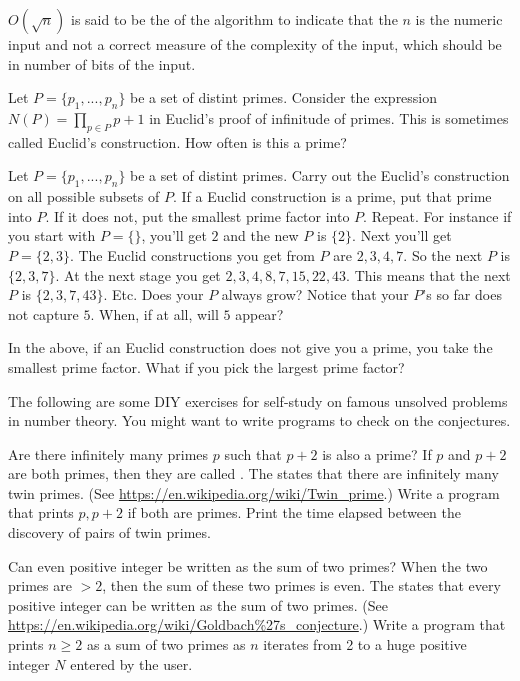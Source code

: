$O(\sqrt{n})$ is said to be the  of the
algorithm
to indicate that the $n$ is the numeric input and not a
correct measure of the complexity of the input,
which should be in number of bits of the input.

\begin{ex}
  Let $P = \{p_1, ..., p_n\}$ be a set of distint primes.
  Consider the expression $N(P) = \prod_{p \in P} p + 1$ in Euclid's proof of infinitude of primes. 
  This is sometimes called Euclid's construction.
  How often is this a prime?
\end{ex}

\begin{ex}
  Let $P = \{p_1, ..., p_n\}$ be a set of distint primes.
  Carry out the Euclid's construction on all possible subsets of $P$.
  If a Euclid construction is a prime, put that prime into $P$.
  If it does not, put the smallest prime factor into $P$.
  Repeat.
  For instance if you start with $P = \{\}$,
  you'll get $2$ and the new $P$ is $\{2\}$.
  Next you'll get $P = \{2, 3\}$.
  The Euclid constructions you get from $P$ are $2, 3, 4, 7$.
  So the next $P$ is $\{2, 3, 7\}$.
  At the next stage you get $2, 3, 4, 8, 7, 15, 22, 43$.
  This means that the next $P$ is $\{2, 3, 7, 43\}$.
  Etc.
  Does your $P$ always grow?
  Notice that your $P$'s so far does not capture $5$.
  When, if at all, will $5$ appear?
\end{ex}

\begin{ex}
  In the above, if an Euclid construction does not give you a prime,
  you take the smallest prime factor.
  What if you pick the largest prime factor?
\end{ex}

The following are some DIY exercises for self-study on famous unsolved problems in
number theory.
You might want to write programs to check on the conjectures.

\begin{ex}
  Are there infinitely many primes $p$ such that $p + 2$ is also a prime?
  If $p$ and $p + 2$ are both primes, then they are called .
  The  states that there are infinitely many
  twin primes.
  (See \url{https://en.wikipedia.org/wiki/Twin_prime}.)
  Write a program that prints $p,p+2$ if both are primes.
  Print the time elapsed between the discovery of pairs of twin primes. 
\end{ex}

\begin{ex}
  Can even positive integer be written as the sum of two primes?
  When the two primes are $> 2$, then the sum of these two primes
  is even.
  The  states that
  every positive integer can be written as the sum of two primes.
  (See \url{https://en.wikipedia.org/wiki/Goldbach%27s_conjecture}.)
  Write a program that prints $n \geq 2$ as a sum of two primes as $n$
  iterates from 2 to a huge positive integer $N$ entered by the user.  
\end{ex}

